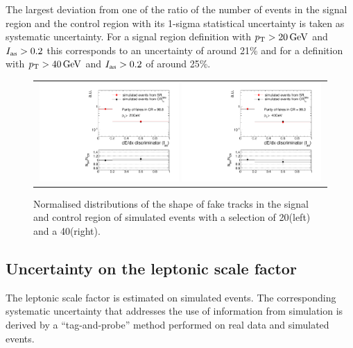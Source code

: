 The largest deviation from one of the ratio of the number of events in the signal region and the control region with its 1-sigma statistical uncertainty is taken as systematic uncertainty.
For a signal region definition with $p_{\text{T}}>20\,\text{Ge}\kern-0.06667em\text{V}$ and $I_{\text{as}}>0.2$ this corresponds to an uncertainty of around 21\% and for a definition with $p_{\text{T}}>40\,\text{Ge}\kern-0.06667em\text{V}$ and $I_{\text{as}}>0.2$ of around 25\%.
\begin{figure}[!h]
  \centering 
  \begin{tabular}{c}
    \includegraphics[width=0.49\textwidth]{figures/analysis/Background/hASmi_SRbinning_fakes_ECalaoLe5_trackPtGt20_MC_CR_MC_SR.pdf}
    \includegraphics[width=0.49\textwidth]{figures/analysis/Background/hASmi_SRbinning_fakes_ECalaoLe5_trackPtGt40_MC_CR_MC_SR.pdf}
  \end{tabular}
  \caption{Normalised distributions of the \ias shape of fake tracks in the signal and control region of simulated \WJets events with a \pt selection of 20\gev (left) and a 40\gev (right).}
  \label{fig:FakeIasUnc}
\end{figure}

\subsection{Uncertainty on the leptonic scale factor}
\label{sec:LeptonScaleUncertainty}

The leptonic scale factor \leptonscalefactor is estimated on simulated \WJets events.
The corresponding systematic uncertainty that addresses the use of information from simulation is derived by a ``tag-and-probe'' method performed on real data and simulated events.

